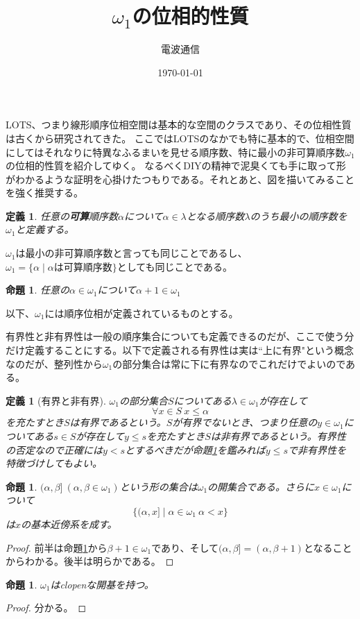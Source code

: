 \documentclass[leqno]{jsarticle}
\title{$\omega_1$の位相的性質}
\author{電波通信}
\date{\today}
\newtheorem{prop}[thm]{命題}
\newtheorem{df}[thm]{定義}
\newcommand{\al}{\alpha}
\newcommand{\be}{\beta}
\newcommand{\la}{\lambda}
\begin{document}
\maketitle
LOTS、つまり線形順序位相空間は基本的な空間のクラスであり、その位相性質は古くから研究されてきた。
ここではLOTSのなかでも特に基本的で、位相空間にしてはそれなりに特異なふるまいを見せる順序数、特に最小の非可算順序数$\omega_1$の位相的性質を紹介してゆく。
なるべくDIYの精神で泥臭くても手に取って形がわかるような証明を心掛けたつもりである。それとあと、図を描いてみることを強く推奨する。
\begin{df}
任意の\textbf{可算}順序数$\al$について$\al\in \la$となる順序数$\la$のうち最小の順序数を$\omega_1$と定義する。
\end{df}
$\omega_1$は最小の非可算順序数と言っても同じことであるし、$\omega_1=\{\al\mid \text{$\al$は可算順序数}\}$としても同じことである。
\begin{prop}\label{+1}
任意の$\al\in \omega_1$について$\al+1\in \omega_1$
\end{prop}
以下、$\omega_1$には順序位相が定義されているものとする。\par
有界性と非有界性は一般の順序集合についても定義できるのだが、ここで使う分だけ定義することにする。以下で定義される有界性は実は``上に有界"という概念なのだが、整列性から$\omega_1$の部分集合は常に下に有界なのでこれだけでよいのである。

\begin{df}[有界と非有界]
$\omega_1$の部分集合$S$についてある$\la\in \omega_1$が存在して
\[
\forall x\in S\ x\le \al
\]
を充たすとき$S$は有界であるという。$S$が有界でないとき、つまり任意の$y\in \omega_1$についてある$s\in S$が存在して$y\le s$を充たすとき$S$は非有界であるという。有界性の否定なので正確には$y<s$とするべきだが命題\ref{+1}を鑑みれば$y\le s$で非有界性を特徴づけしてもよい。
\end{df}

\begin{prop}\label{nei}
$(\al,\be]\ (\al,\be\in\omega_1)$という形の集合は$\omega_1$の開集合である。さらに$x\in \omega_1$について
\[
\{(\al,x]\mid \al\in\omega_1\ \al<x\}
\]
は$x$の基本近傍系を成す。
\end{prop}
\begin{proof}
前半は命題\ref{+1}から$\be+1\in \omega_1$であり、そして$(\al,\be]=(\al,\be+1)$となることからわかる。後半は明らかである。
\end{proof}

\begin{prop}
$\omega_1$はclopenな開基を持つ。
\end{prop}
\begin{proof}
分かる。
\end{proof}
\end{document}
